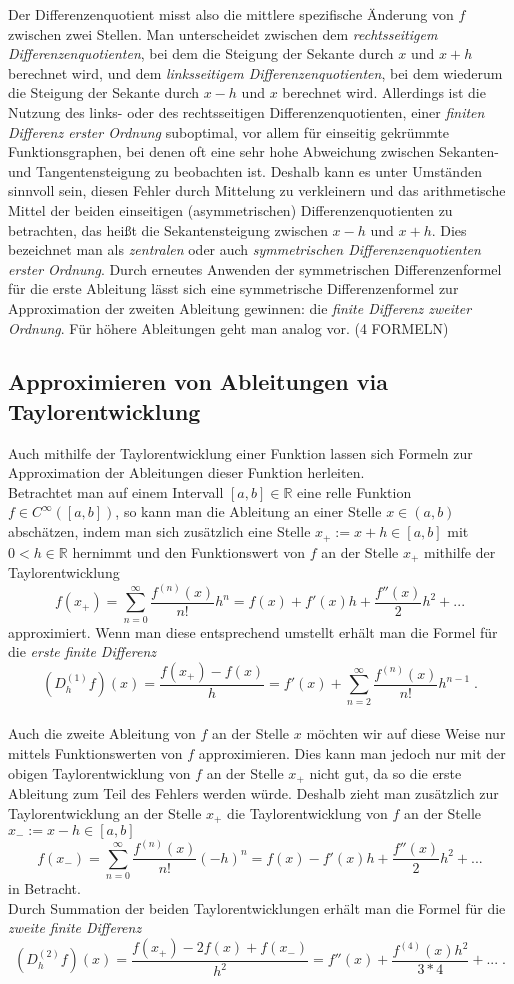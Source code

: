 \documentclass{scrartcl}
\begin{document}
Der Differenzenquotient misst also die mittlere spezifische Änderung von $f$ zwischen zwei Stellen. Man unterscheidet zwischen dem \textit{rechtsseitigem Differenzenquotienten}, bei dem die Steigung der Sekante durch $x$ und $x+h$ berechnet wird, und dem \textit{linksseitigem Differenzenquotienten}, bei dem wiederum die Steigung der Sekante durch $x-h$ und $x$ berechnet wird. Allerdings ist die Nutzung des links- oder des rechtsseitigen Differenzenquotienten, einer \textit{finiten Differenz erster Ordnung} suboptimal, vor allem für einseitig gekrümmte Funktionsgraphen, bei denen oft eine sehr hohe Abweichung zwischen Sekanten- und Tangentensteigung zu beobachten ist. Deshalb kann es unter Umständen sinnvoll sein, diesen Fehler durch Mittelung zu verkleinern und das arithmetische Mittel der beiden einseitigen (asymmetrischen) Differenzenquotienten zu betrachten, das heißt die Sekantensteigung zwischen $x-h$ und $x+h$. Dies bezeichnet man als \textit{zentralen} oder auch \textit{symmetrischen Differenzenquotienten erster Ordnung}. Durch erneutes Anwenden der symmetrischen Differenzenformel für die erste Ableitung lässt sich eine symmetrische Differenzenformel zur Approximation der zweiten Ableitung gewinnen: die \textit{finite Differenz zweiter Ordnung}. Für höhere Ableitungen geht man analog vor. (4 FORMELN) \\

\subsection{Approximieren von Ableitungen via Taylorentwicklung}
\label{ssec:herleitung2}
Auch mithilfe der Taylorentwicklung einer Funktion lassen sich Formeln zur Approximation der Ableitungen dieser Funktion herleiten.\\
Betrachtet man auf einem Intervall $[a,b]\in\mathbb{R}$ eine relle Funktion $f\in C^\infty([a,b])$, so kann man die Ableitung an einer Stelle $x\in(a,b)$ abschätzen, indem man sich zusätzlich eine Stelle $x_+ := x+h\in[a,b]$ mit $0<h\in\mathbb{R}$ hernimmt und den Funktionswert von $f$ an der Stelle $x_+$ mithilfe der Taylorentwicklung
\[f(x_+)=\sum_{n=0}^{\infty}\frac{f^{(n)}(x)}{n!}h^n=f(x)+f'(x)h+\frac{f''(x)}{2}h^2+...\]
approximiert. Wenn man diese entsprechend umstellt erhält man die Formel für die \textit{erste finite Differenz}
\[(D_h^{(1)}f)(x)=\frac{f(x_+)-f(x)}{h}=f'(x)+\sum_{n=2}^{\infty}\frac{f^(n)(x)}{n!}h^{n-1}\;.\]\\
Auch die zweite Ableitung von $f$ an der Stelle $x$ möchten wir auf diese Weise nur mittels Funktionswerten von $f$ approximieren. Dies kann man jedoch nur mit der obigen Taylorentwicklung von $f$ an der Stelle $x_+$ nicht gut, da so die erste Ableitung zum Teil des Fehlers werden würde. Deshalb zieht man zusätzlich zur Taylorentwicklung an der Stelle $x_+$ die Taylorentwicklung von $f$ an der Stelle $x_-:=x-h\in[a,b]$
\[f(x_-)=\sum_{n=0}^{\infty}\frac{f^{(n)}(x)}{n!}(-h)^n=f(x)-f'(x)h+\frac{f''(x)}{2}h^2+...\]
in Betracht.\\
Durch Summation der beiden Taylorentwicklungen erhält man die Formel für die \textit{zweite finite Differenz}
\[(D_h^{(2)}f)(x)=\frac{f(x_+)-2f(x)+f(x_-)}{h^2}=f''(x)+\frac{f^{(4)}(x)h^2}{3*4}+...\;.\]
\end{document}
